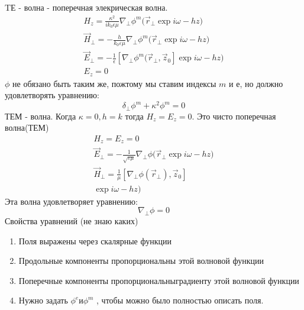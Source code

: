 TЕ - волна - поперечная элекрическая волна.
\begin{gather}
%
H_z = \frac{\kappa^2}{i k_0 \epsilon \mu} \nabla_\perp \phi^m(\vec{r}_{\perp} \exp{i\omega - h z)}\\
%
\vec{H}_\perp = - \frac{h}{k_0 \varepsilon \mu} \nabla_\perp \phi^m(\vec{r}_{\perp} \exp{i\omega - h z)} \\
%
\vec{E}_\perp = - \frac{1}{\epsilon} [\nabla_\perp \phi^m(\vec{r}_{\perp}, \vec{z}_0] \exp{i\omega - h z)}\\
E_z = 0
%
\end{gather}
$\phi$ не обязано быть таким же, пожтому мы ставим индексы $m$ и $е$, но должно удовлетворять уравнению:
\begin{equation}
	\delta_\perp \phi^m + \kappa^2 \phi^m = 0
\end{equation}
ТЕМ - волна.
Когда $\kappa = 0, h = k$ тогда $H_z = E_z = 0$. Это чисто поперечная волна(ТЕМ)
\begin{gather}
	H_z = E_z = 0\\
	\vec{E}_\perp = - \frac{1}{\sqrt{\varepsilon \mu}} \nabla_\perp \phi(\vec{r}_\perp \exp{i\omega - h z)} \\
	\vec{H}_\perp = \frac{1}{\mu} [\nabla_\perp \phi(\vec{r}_\perp), \vec{z}_0] \\\exp{i\omega - h z)}
\end{gather}
Эта волна удовлетворяет уравнению:
\begin{equation}
	\nabla_\perp \phi = 0
\end{equation}
Свойства уравнений (не знаю каких)
\begin{enumerate}
	\item Поля выражены через скалярные функции
	\item Продольные компоненты пропорциональны этой волновой функции
	\item Поперечные компоненты пропорциональныградиенту этой волновой функции
	\item  Нужно задать $\phi^e и \phi^m$ , чтобы можно было полностью описать поля.
\end{enumerate}